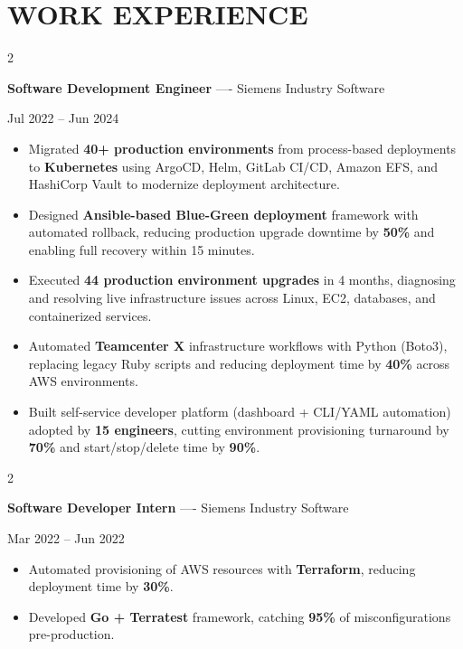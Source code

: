 \documentclass[10pt, letterpaper]{article}
\newenvironment{highlights}{
    \begin{itemize}[
        topsep=0.10 cm,
        parsep=0.06 cm,
        partopsep=0pt,
        itemsep=0.06 cm,
        leftmargin=12pt
    ]
}{
    \end{itemize}
}
\newenvironment{twocolentry}[2][]{
    \onecolentry
    \def\secondColumn{#2}
    \setcolumnwidth{\fill, 4.5 cm}
    \begin{paracol}{2}
}{
    \switchcolumn \raggedleft \secondColumn
    \end{paracol}
    \endonecolentry
}
\begin{document}
\section{WORK EXPERIENCE}
\begin{twocolentry}{Jul 2022 -- Jun 2024}
\textbf{Software Development Engineer} ---- Siemens Industry Software
\end{twocolentry}
\begin{highlights}
  \item Migrated \textbf{40+ production environments} from process-based deployments to \textbf{Kubernetes} using ArgoCD, Helm, GitLab CI/CD, Amazon EFS, and HashiCorp Vault to modernize deployment architecture.
  \item Designed \textbf{Ansible-based Blue-Green deployment} framework with automated rollback, reducing production upgrade downtime by \textbf{50\%} and enabling full recovery within 15 minutes.
  \item Executed \textbf{44 production environment upgrades} in 4 months, diagnosing and resolving live infrastructure issues across Linux, EC2, databases, and containerized services.
  \item Automated \textbf{Teamcenter X} infrastructure workflows with Python (Boto3), replacing legacy Ruby scripts and reducing deployment time by \textbf{40\%} across AWS environments.
  \item Built self-service developer platform (dashboard + CLI/YAML automation) adopted by \textbf{15 engineers}, cutting environment provisioning turnaround by \textbf{70\%} and start/stop/delete time by \textbf{90\%}.
\end{highlights}

\vspace{0.15 cm}

\begin{twocolentry}{Mar 2022 -- Jun 2022}
\textbf{Software Developer Intern} ---- Siemens Industry Software
\end{twocolentry}
\begin{highlights}
  \item Automated provisioning of AWS resources with \textbf{Terraform}, reducing deployment time by \textbf{30\%}.
  \item Developed \textbf{Go + Terratest} framework, catching \textbf{95\%} of misconfigurations pre-production.
\end{highlights}

\vspace{0.15 cm}
\end{document}
